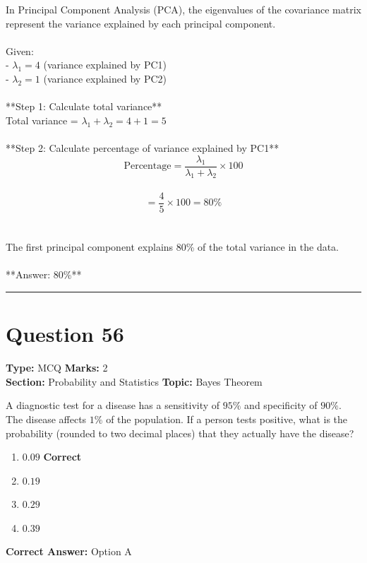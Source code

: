 \documentclass[11pt]{article}
\begin{document}
In Principal Component Analysis (PCA), the eigenvalues of the covariance matrix represent the variance explained by each principal component.\\
\\
Given:\\
- \(\lambda_1 = 4\) (variance explained by PC1)\\
- \(\lambda_2 = 1\) (variance explained by PC2)\\
\\
**Step 1: Calculate total variance**\\
Total variance = \(\lambda_1 + \lambda_2 = 4 + 1 = 5\)\\
\\
**Step 2: Calculate percentage of variance explained by PC1**\\
\[\text{Percentage} = \frac{\lambda_1}{\lambda_1 + \lambda_2} \times 100\]\\
\[= \frac{4}{5} \times 100 = 80\%\]\\
\\
The first principal component explains 80\% of the total variance in the data.\\
\\
**Answer: 80\%**

\vspace{0.8em}
\hrule
\vspace{0.4em}
\section*{Question 56}
\textbf{Type:} MCQ \hfill \textbf{Marks:} 2\\
\textbf{Section:} Probability and Statistics \hfill \textbf{Topic:} Bayes Theorem

A diagnostic test for a disease has a sensitivity of \(95\%\) and specificity of \(90\%\). The disease affects \(1\%\) of the population. If a person tests positive, what is the probability (rounded to two decimal places) that they actually have the disease?


\begin{enumerate}[label=\textbf{\Alph*.}, leftmargin=1.8em]
\item \(0.09\) \hfill {\color{gategreen}\textbf{Correct}}\item \(0.19\)\item \(0.29\)\item \(0.39\)\end{enumerate}

\textbf{Correct Answer:} Option A
\end{document}
